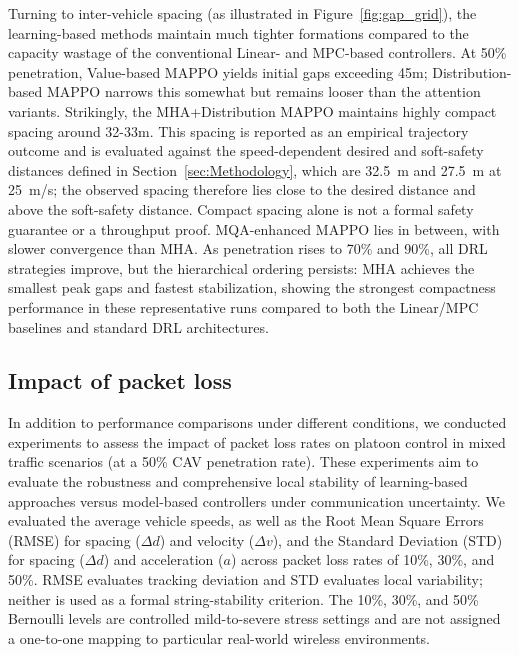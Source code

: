 \documentclass{ieeeaccess}
\begin{document}
Turning to inter-vehicle spacing (as illustrated in Figure~\ref{fig:gap_grid}), the learning-based methods maintain much tighter formations compared to the capacity wastage of the conventional Linear- and MPC-based controllers. At 50\% penetration, Value-based MAPPO yields initial gaps exceeding 45m; Distribution-based MAPPO narrows this somewhat but remains looser than the attention variants. Strikingly, the MHA+Distribution MAPPO maintains highly compact spacing around 32-33m. This spacing is reported as an empirical trajectory outcome and is evaluated against the speed-dependent desired and soft-safety distances defined in Section~\ref{sec:Methodology}, which are 32.5~m and 27.5~m at 25~m/s; the observed spacing therefore lies close to the desired distance and above the soft-safety distance. Compact spacing alone is not a formal safety guarantee or a throughput proof. MQA-enhanced MAPPO lies in between, with slower convergence than MHA. As penetration rises to 70\% and 90\%, all DRL strategies improve, but the hierarchical ordering persists: MHA achieves the smallest peak gaps and fastest stabilization, showing the strongest compactness performance in these representative runs compared to both the Linear/MPC baselines and standard DRL architectures.


\subsection{Impact of packet loss}
\label{sec:impact_packet_loss}

In addition to performance comparisons under different conditions, we conducted experiments to assess the impact of packet loss rates on platoon control in mixed traffic scenarios (at a 50\% CAV penetration rate). These experiments aim to evaluate the robustness and comprehensive local stability of learning-based approaches versus model-based controllers under communication uncertainty. We evaluated the average vehicle speeds, as well as the Root Mean Square Errors (RMSE) for spacing ($\Delta d$) and velocity ($\Delta v$),  and the Standard Deviation (STD) for spacing ($\Delta d$) and acceleration ($a$) across packet loss rates of 10\%, 30\%, and 50\%. RMSE evaluates tracking deviation and STD evaluates local variability; neither is used as a formal string-stability criterion. The 10\%, 30\%, and 50\% Bernoulli levels are controlled mild-to-severe stress settings and are not assigned a one-to-one mapping to particular real-world wireless environments.
\end{document}
